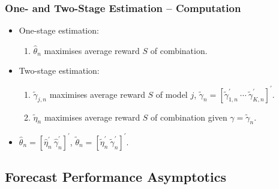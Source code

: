 \documentclass[aspectratio=169]{beamer}
\begin{document}
\def \negspace {5mm}

\begin{frame}
\frametitle{One- and Two-Stage Estimation -- Computation}
\begin{itemize}
\item<1-> One-stage estimation:
\vspace{\negspace}
\begin{enumerate}
\item<2-> $\hat{\theta}_n$ maximises average reward $S$ of combination.
\end{enumerate}
\vspace{\negspace}
\item<3-> Two-stage estimation:
\vspace{\negspace}
\begin{enumerate}
\item<4-> $\tilde{\gamma}_{j,n}$ maximises average reward $S$ of model $j$, $\tilde{\gamma}_n = [\tilde{\gamma}^{\prime}_{1,n}\ \cdots\ \tilde{\gamma}^{\prime}_{K,n}]^{\prime}$.
\vspace{\negspace}
\item<5-> $\tilde{\eta}_n$ maximises average reward $S$ of combination given $\gamma = \tilde{\gamma}_n$.
\end{enumerate}
\vspace{\negspace}
\item<6-> $\hat{\theta}_n = [\hat{\eta}_n^{\prime}\ \hat{\gamma}_n^{\prime}]^{\prime}$, $\tilde{\theta}_n = [\tilde{\eta}_n^{\prime}\ \tilde{\gamma}_n^{\prime}]^{\prime}$.
\end{itemize}
\end{frame}

\subsection{Forecast Performance Asymptotics}
\end{document}
